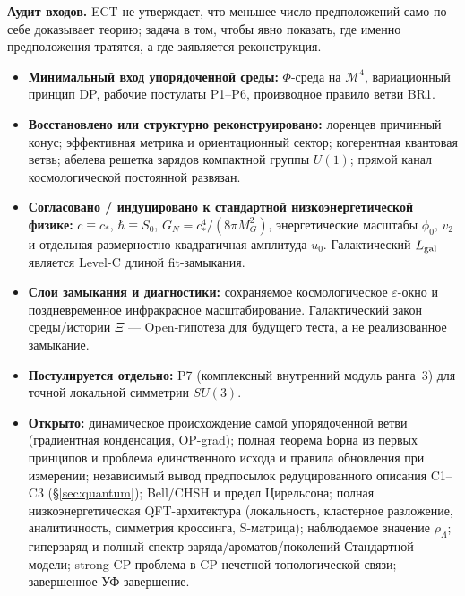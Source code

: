 \documentclass[11pt,a4paper]{article}
\begin{document}
\begin{mechbox}
\textbf{Аудит входов.}
ECT не утверждает, что меньшее число предположений само по себе
доказывает теорию; задача в том, чтобы явно показать, где именно
предположения тратятся, а где заявляется реконструкция.
\begin{itemize}[leftmargin=1.2em,itemsep=1pt]
\item \textbf{Минимальный вход упорядоченной среды:}
      $\Phi$-среда на $\mathcal{M}^4$, вариационный принцип DP,
      рабочие постулаты P1--P6, производное правило ветви BR1.
\item \textbf{Восстановлено или структурно реконструировано:}
      лоренцев причинный конус; эффективная метрика и
      ориентационный сектор; когерентная квантовая ветвь;
      абелева решетка зарядов компактной группы $U(1)$; прямой канал
      космологической постоянной развязан.
\item \textbf{Согласовано / индуцировано к стандартной
      низкоэнергетической физике:}
      $c\equiv c_*$, $\hbar\equiv S_0$,
      $G_N=c_*^4/(8\pi M_G^2)$, энергетические масштабы
      $\phi_0,\,v_2$ и отдельная размерностно-квадратичная амплитуда
      $u_0$. Галактический $L_{\rm gal}$ является Level-C длиной fit-замыкания.
\item \textbf{Слои замыкания и диагностики:}
      сохраняемое космологическое $\varepsilon$-окно и
      поздневременное инфракрасное масштабирование. Галактический
      закон среды/истории $\Xi$ — Open-гипотеза для будущего теста,
      а не реализованное замыкание.
\item \textbf{Постулируется отдельно:}
      P7 (комплексный внутренний модуль ранга~3) для точной
      локальной симметрии $SU(3)$.
\item \textbf{Открыто:}
      динамическое происхождение самой упорядоченной ветви
      (градиентная конденсация, OP-grad);
      полная теорема Борна из первых принципов и проблема
      единственного исхода и правила обновления при измерении;
      независимый вывод предпосылок редуцированного описания
      C1--C3 (\S\ref{sec:quantum});
      Bell/CHSH и предел Цирельсона;
      полная низкоэнергетическая QFT-архитектура (локальность,
      кластерное разложение, аналитичность, симметрия кроссинга,
      S-матрица);
      наблюдаемое значение $\rho_\Lambda$;
      гиперзаряд и полный спектр заряда/ароматов/поколений
      Стандартной модели;
      strong-CP проблема в CP-нечетной топологической связи;
      завершенное УФ-завершение.
\end{itemize}
\end{mechbox}
\end{document}
